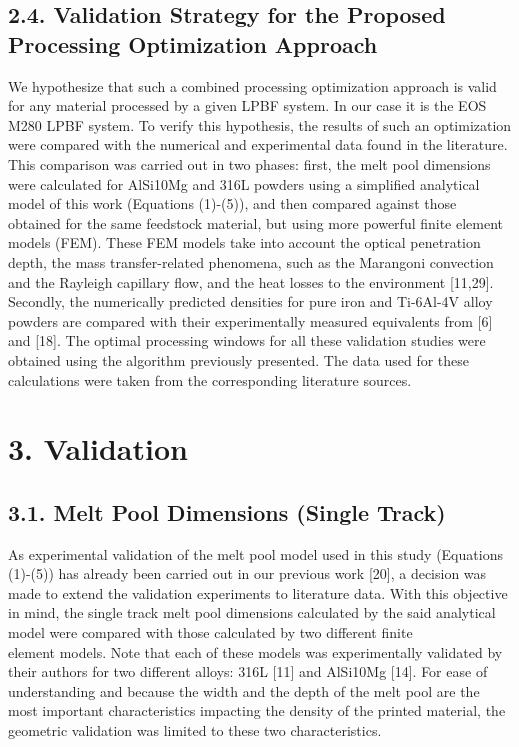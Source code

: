 \documentclass[10pt]{article}
\begin{document}
\subsection*{2.4. Validation Strategy for the Proposed Processing Optimization Approach}
We hypothesize that such a combined processing optimization approach is valid for any material processed by a given LPBF system. In our case it is the EOS M280 LPBF system. To verify this hypothesis, the results of such an optimization were compared with the numerical and experimental data found in the literature. This comparison was carried out in two phases: first, the melt pool dimensions were calculated for AlSi10Mg and 316L powders using a simplified analytical model of this work (Equations (1)-(5)), and then compared against those obtained for the same feedstock material, but using more powerful finite element models (FEM). These FEM models take into account the optical penetration depth, the mass transfer-related phenomena, such as the Marangoni convection and the Rayleigh capillary flow, and the heat losses to the environment [11,29]. Secondly, the numerically predicted densities for pure iron and Ti-6Al-4V alloy powders are compared with their experimentally measured equivalents from [6] and [18]. The optimal processing windows for all these validation studies were obtained using the algorithm previously presented. The data used for these calculations were taken from the corresponding literature sources.

\section*{3. Validation}
\subsection*{3.1. Melt Pool Dimensions (Single Track)}
As experimental validation of the melt pool model used in this study (Equations (1)-(5)) has already been carried out in our previous work [20], a decision was made to extend the validation experiments to literature data. With this objective in mind, the single track melt pool dimensions calculated by the said analytical model were compared with those calculated by two different finite\\
element models. Note that each of these models was experimentally validated by their authors for two different alloys: 316L [11] and AlSi10Mg [14]. For ease of understanding and because the width and the depth of the melt pool are the most important characteristics impacting the density of the printed material, the geometric validation was limited to these two characteristics.
\end{document}
